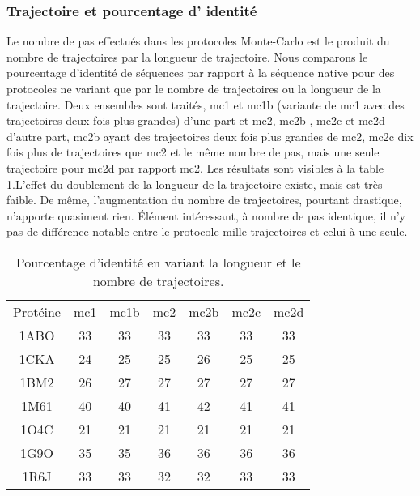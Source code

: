    \subsubsection{Trajectoire et pourcentage d' identité} 

Le nombre de pas effectués dans les protocoles Monte-Carlo est le produit du nombre de trajectoires par la longueur de trajectoire. Nous comparons le pourcentage d'identité de séquences par rapport à la séquence native pour des protocoles ne variant que par le nombre de trajectoires ou la longueur de la trajectoire. Deux ensembles sont traités, mc1 et mc1b (variante de mc1 avec des trajectoires deux fois plus grandes) d'une part et mc2, mc2b , mc2c et mc2d d'autre part, mc2b ayant des trajectoires deux fois plus grandes de mc2, mc2c dix fois plus de trajectoires que mc2 et le même nombre de pas, mais une seule trajectoire pour mc2d par rapport mc2.
Les résultats sont visibles à la table \ref{tab:Traj_ident}.L'effet du doublement de la longueur de la trajectoire existe, mais est très faible. De même, l'augmentation du nombre de trajectoires, pourtant drastique, n'apporte quasiment rien. Élément intéressant, à nombre de pas identique, il n'y pas de différence notable entre le protocole mille trajectoires et celui à une seule.  

    \begin{table}[!htbp]
      \centering
      
      \begin{tabular}{ccccccc}

        \toprule
        Protéine & mc1 & mc1b & mc2  & mc2b & mc2c & mc2d  \\
        \cmidrule{1-7}      
        1ABO & 33 & 33 & 33 & 33 & 33  & 33 \\      
        1CKA & 24 & 25 & 25 & 26 & 25  & 25 \\  
        1BM2 & 26 & 27 & 27 & 27 & 27  & 27 \\  
        1M61 & 40 & 40 & 41 & 42 & 41  & 41 \\  
        1O4C & 21 & 21 & 21 & 21 & 21  & 21 \\  
        1G9O & 35 & 35 & 36 & 36 & 36  & 36 \\  
        1R6J & 33 & 33 & 32 & 32 & 33  & 33 \\  
        \bottomrule
      \end{tabular}
      

      \caption{Pourcentage d'identité en variant la longueur et le nombre de trajectoires.}      
      \label{tab:Traj_ident}
    \end{table}


